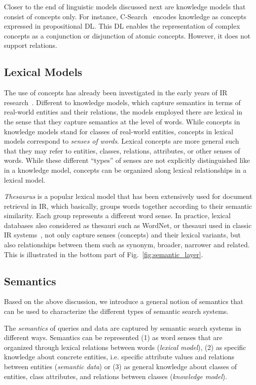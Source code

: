 Closer to the end of linguistic models discussed next are knowledge models that consist of concepts only. For instance, C-Search~\cite{DBLP:conf/esws/GiunchigliaKZ09} encodes knowledge as concepts expressed in propositional DL. This DL enables the representation of complex concepts as a conjunction or disjunction of atomic concepts. However, it does not support relations. 

		
\subsection{Lexical Models} The use of concepts has already been investigated in the early years of IR research~\cite{DBLP:conf/sigir/Giger88}. Different to knowledge models, which capture semantics in terms of real-world entities and their relations, the models employed there are lexical in the sense that they capture semantics at the level of words. While concepts in knowledge models stand for classes of real-world entities, concepts in lexical models correspond to \emph{senses of words}. Lexical concepts are more general such that they may refer to entities, classes, relations, attributes, or other senses of words. While these different ``types'' of senses are not explicitly distinguished like in a knowledge model, concepts can be organized along lexical relationships in a lexical model. 

\emph{Thesaurus} 
is a popular lexical model that has been extensively used for document retrieval in IR, which basically, groups words together according to their semantic similarity. Each group represents a different word sense. In practice, lexical databases also considered as thesauri such as WordNet, or thesauri used in classic IR systems~\cite{DBLP:conf/sigir/Giger88}, not only capture senses (concepts) and their lexical variants, but also relationships between them such as synonym, broader, narrower and related. This is illustrated in the bottom part of Fig.~\ref{fig:semantic_layer}. 


\subsection{Semantics} 
Based on the above discussion, we introduce a general notion of semantics that can be used to characterize the different types of semantic search systems.

\begin{definition} The \emph{semantics} of queries and data are captured by semantic search systems in different ways. Semantics can be represented (1) as word senses that are organized through lexical relations between words (\emph{lexical model}), (2) as specific knowledge about concrete entities, i.e. specific attribute values and relations between entities (\emph{semantic data}) or (3) as general knowledge about classes of entities, class attributes, and relations between classes (\emph{knowledge model}). 
\end{definition}

